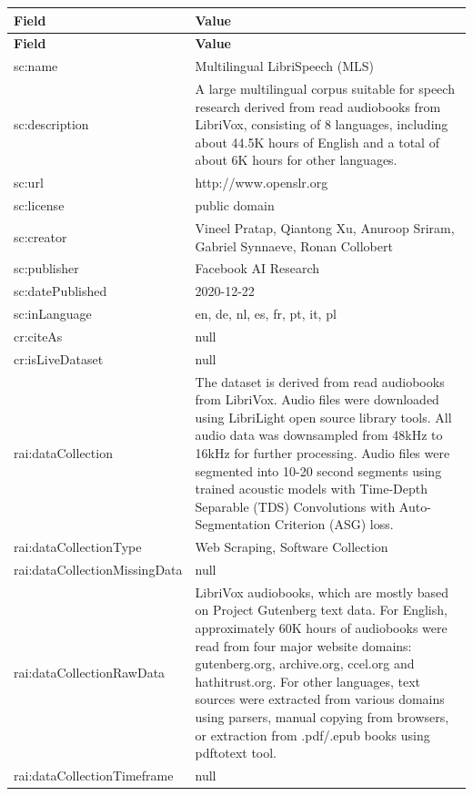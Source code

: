 \documentclass[10pt,a4paper]{article}
\begin{document}
\begin{longtable}{|p{4cm}|p{12cm}|}
\hline
\textbf{Field} & \textbf{Value} \\
\hline
\endfirsthead
\hline
\textbf{Field} & \textbf{Value} \\
\hline
\endhead
\hline
\endfoot

sc:name & Multilingual LibriSpeech (MLS) \\
\hline
sc:description & A large multilingual corpus suitable for speech research derived from read audiobooks from LibriVox, consisting of 8 languages, including about 44.5K hours of English and a total of about 6K hours for other languages. \\
\hline
sc:url & http://www.openslr.org \\
\hline
sc:license & public domain \\
\hline
sc:creator & Vineel Pratap, Qiantong Xu, Anuroop Sriram, Gabriel Synnaeve, Ronan Collobert \\
\hline
sc:publisher & Facebook AI Research \\
\hline
sc:datePublished & 2020-12-22 \\
\hline
sc:inLanguage & en, de, nl, es, fr, pt, it, pl \\
\hline
cr:citeAs & null \\
\hline
cr:isLiveDataset & null \\
\hline
rai:dataCollection & The dataset is derived from read audiobooks from LibriVox. Audio files were downloaded using LibriLight open source library tools. All audio data was downsampled from 48kHz to 16kHz for further processing. Audio files were segmented into 10-20 second segments using trained acoustic models with Time-Depth Separable (TDS) Convolutions with Auto-Segmentation Criterion (ASG) loss. \\
\hline
rai:dataCollectionType & Web Scraping, Software Collection \\
\hline
rai:dataCollectionMissingData & null \\
\hline
rai:dataCollectionRawData & LibriVox audiobooks, which are mostly based on Project Gutenberg text data. For English, approximately 60K hours of audiobooks were read from four major website domains: gutenberg.org, archive.org, ccel.org and hathitrust.org. For other languages, text sources were extracted from various domains using parsers, manual copying from browsers, or extraction from .pdf/.epub books using pdftotext tool. \\
\hline
rai:dataCollectionTimeframe & null \\

\end{longtable}
\end{document}
